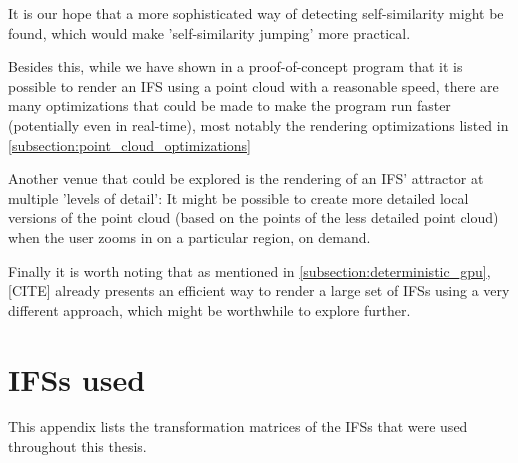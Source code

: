 \documentclass[11pt]{article}
\begin{document}
It is our hope that a more sophisticated way of detecting self-similarity might be found,
which would make 'self-similarity jumping' more practical.

Besides this, while we have shown in a proof-of-concept program that it is possible to render an IFS using a point cloud
with a reasonable speed, there are many optimizations that could be made to make the program run faster (potentially even in real-time),
most notably the rendering optimizations listed in \autoref{subsection:point_cloud_optimizations}

Another venue that could be explored is the rendering of an IFS' attractor at multiple 'levels of detail':
It might be possible to create more detailed local versions of the point cloud (based on the points of the less detailed point cloud) when the user
zooms in on a particular region, on demand.

Finally it is worth noting that as mentioned in \autoref{subsection:deterministic_gpu}, [CITE] already presents an efficient way to render a large set of IFSs using a very different approach, 
which might be worthwhile to explore further.

\appendix

\section{IFSs used}
\label{sec:org1bada2f}

This appendix lists the transformation matrices of the IFSs that were used throughout this thesis.


\label{ifs:sierpinsky}
\label{ifs:barnsley_fern}
\label{ifs:dragon_curve}
\end{document}
